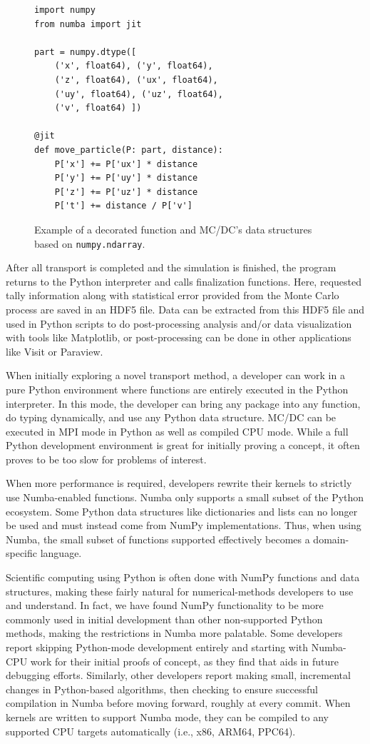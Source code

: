 \begin{figure}
\begin{verbatim}
import numpy
from numba import jit

part = numpy.dtype([
    ('x', float64), ('y', float64),
    ('z', float64), ('ux', float64),
    ('uy', float64), ('uz', float64),
    ('v', float64) ])

@jit
def move_particle(P: part, distance):
    P['x'] += P['ux'] * distance
    P['y'] += P['uy'] * distance
    P['z'] += P['uz'] * distance
    P['t'] += distance / P['v']
\end{verbatim}
\caption{Example of a decorated function and MC/DC's data structures based on \texttt{numpy.ndarray}.}
\label{fig:jitfunctions}
\end{figure}

After all transport is completed and the simulation is finished, the program returns to the Python interpreter and calls finalization functions.
Here, requested tally information along with statistical error provided from the Monte Carlo process are saved in an HDF5 file.
Data can be extracted from this HDF5 file and used in Python scripts to do post-processing analysis and/or data visualization with tools like Matplotlib, or post-processing can be done in other applications like Visit or Paraview.

When initially exploring a novel transport method, a developer can work in a pure Python environment where functions are entirely executed in the Python interpreter.
In this mode, the developer can bring any package into any function, do typing dynamically, and use any Python data structure.
MC/DC can be executed in MPI mode in Python as well as compiled CPU mode.
While a full Python development environment is great for initially proving a concept, it often proves to be too slow for problems of interest.

When more performance is required, developers rewrite their kernels to strictly use Numba-enabled functions.
Numba only supports a small subset of the Python ecosystem. 
Some Python data structures like dictionaries and lists can no longer be used and must instead come from NumPy implementations. 
Thus, when using Numba, the small subset of functions supported effectively becomes a domain-specific language.

Scientific computing using Python is often done with NumPy functions and data structures, making these fairly natural for numerical-methods developers to use and understand.
In fact, we have found NumPy functionality to be more commonly used in initial development than other non-supported Python methods, making the restrictions in Numba more palatable.
Some developers report skipping Python-mode development entirely and starting with Numba-CPU work for their initial proofs of concept, as they find that aids in future debugging efforts.
Similarly, other developers report making small, incremental changes in Python-based algorithms, then checking to ensure successful compilation in Numba before moving forward, roughly at every commit.
When kernels are written to support Numba mode, they can be compiled to any supported CPU targets automatically (i.e., x86, ARM64, PPC64).

